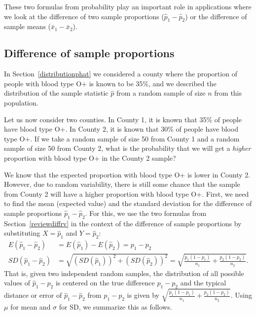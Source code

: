 These two formulas from probability play an important role in
applications where we look at the difference of two sample
proportions ($\hat{p}_1 - \hat{p}_2$) or the difference of
sample means ($\bar{x}_1 - \bar{x}_2$).


\D{\newpage}

\subsection{Difference of sample proportions}
\label{distributionofdifference_diff_samp_props}

In Section~\ref{distributionphat} we considered a county where the proportion of people with blood type O+ is known to be 35\%, and we described the distribution of the sample statistic $\hat{p}$ from a random sample of size $n$ from this population.

Let us now consider two counties.  In County 1, it is known that 35\% of people have blood type O+.  In County 2, it is known that 30\% of people have blood type O+.  If we take a random sample of size 50 from County 1 and a random sample of size 50 from County 2, what is the probability that we will get a \emph{higher} proportion with blood type O+ in the County 2 sample?

We know that the expected proportion with blood type O+ is lower in County 2.  However, due to random variability, there is still some chance that the sample from County 2 will have a higher proportion with blood type O+.  First, we need to find the mean (expected value) and the standard deviation for the difference of sample proportions $\hat{p}_1 - \hat{p}_2$. For this, we use the two formulas from Section~\ref{reviewdiffrv} in the context of the difference of sample proportions by substituting $X = \hat{p}_1$ and $Y = \hat{p}_2$:
\begin{align*}
E(\hat{p}_1 - \hat{p}_2) &= E(\hat{p}_1) - E(\hat{p}_2) = p_1 - p_2 \\
SD(\hat{p}_1 - \hat{p}_2) &=  \sqrt{(SD(\hat{p}_1))^2 + (SD(\hat{p}_2))^2}=  \sqrt{\frac{p_1(1-p_1)}{n_1} + \frac{p_2(1-p_2)}{n_2}}.
\end{align*}
That is, given two independent random samples, the distribution of all possible values of $\hat{p}_1 - \hat{p}_2$ is centered on the true difference $p_1-p_2$ and the typical distance or error of $\hat{p}_1 - \hat{p}_2$ from $p_1-p_2$ is given by $\sqrt{\frac{p_1(1-p_1)}{n_1} + \frac{p_2(1-p_2)}{n_2}}$.
Using $\mu$ for mean and $\sigma$ for SD, we summarize this as follows.

